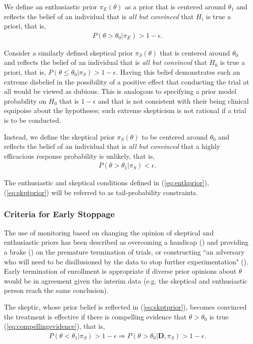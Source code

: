 \documentclass[12pt]{article}
\begin{document}
We define an enthusiastic prior $\pi_{E}(\theta)$ as a prior that is centered around $\theta_1$ and reflects the belief of an individual that is \textit{all but convinced} that $H_i$ is true a priori, that is, 
\begin{align}\label{eq:enthprior}
P(\theta >\theta_0| \pi_{E})>1-\epsilon.
\end{align} 

Consider a similarly defined skeptical prior $\pi_{S}(\theta)$ that is centered around $\theta_0$ and reflects the belief of an individual that is \textit{all but convinced} that $H_0$ is true a priori, that is, $P(\theta\leq\theta_0| \pi_{S})>1-\epsilon$. Having this belief demonstrates such an extreme disbelief in the possibility of a positive effect that conducting the trial at all would be viewed as dubious. This is analogous to specifying a prior model probability on $H_0$ that is $1-\epsilon$ and that is not consistent with their being clinical equipoise about the hypotheses; such extreme skepticism is not rational if a trial is to be conducted. 

Instead, we define the skeptical prior $\pi_S(\theta)$ to be centered around $\theta_0$ and reflects the belief of an individual that is \textit{all but convinced} that a highly efficacious response probability is unlikely, that is,  
\begin{align}\label{eq:skptprior}
P(\theta>\theta_1| \pi_{S})<\epsilon.
\end{align}

The enthusiastic and skeptical conditions defined in (\ref{eq:enthprior}), (\ref{eq:skptprior}) will be referred to as tail-probability constraints.

\subsubsection{Criteria for Early Stoppage}
The use of monitoring based on changing the opinion of skeptical and enthusiastic priors has been described as overcoming a handicap (\cite{Freedman1989}) and providing a brake (\cite{Fayers1997}) on the premature termination of trials, or constructing ``an adversary who will need to be disillusioned by the data to stop further experimentation" (\cite{Spiegelhalter1994}). Early termination of enrollment is appropriate if diverse prior opinions about $\theta$ would be in agreement given the interim data (e.g. the skeptical and enthusiastic person reach the same conclusion). 

The skeptic, whose prior belief is reflected in (\ref{eq:skptprior}), becomes convinced the treatment is effective if there is compelling evidence that $\theta>\theta_0$ is true (\ref{eq:compellingevidence}), that is, 
\begin{align}
P(\theta<\theta_1|\pi_{S})>1-\epsilon \Rightarrow P(\theta>\theta_0| \mathbf{D},\pi_{S})>1-\epsilon.
\end{align}
\end{document}
